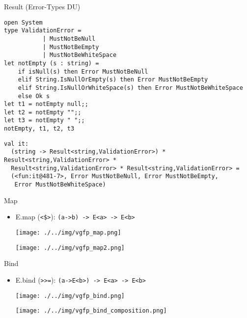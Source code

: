 \documentclass[t]{beamer}
\begin{document}
\begin{frame}[label={sec:org088bd28},fragile]{Result (Error-Types DU)}
 \begin{verbatim}
open System
type ValidationError =
           | MustNotBeNull
           | MustNotBeEmpty
           | MustNotBeWhiteSpace
let notEmpty (s : string) =
    if isNull(s) then Error MustNotBeNull
    elif String.IsNullOrEmpty(s) then Error MustNotBeEmpty
    elif String.IsNullOrWhiteSpace(s) then Error MustNotBeWhiteSpace
    else Ok s
let t1 = notEmpty null;;
let t2 = notEmpty "";;
let t3 = notEmpty " ";;
notEmpty, t1, t2, t3
\end{verbatim}

\begin{verbatim}
val it:
  (string -> Result<string,ValidationError>) * Result<string,ValidationError> *
  Result<string,ValidationError> * Result<string,ValidationError> =
  (<fun:it@481-7>, Error MustNotBeNull, Error MustNotBeEmpty,
   Error MustNotBeWhiteSpace)
\end{verbatim}
\end{frame}

\begin{frame}[label={sec:org7eb9096},fragile]{Map}
 \begin{itemize}
\item E.map (\texttt{<\$>}): \texttt{(a->b) -> E<a> -> E<b>}
\begin{center}
\texttt{[image: ./../img/vgfp\_map.png]}
\end{center}
\begin{center}
\texttt{[image: ./../img/vgfp\_map2.png]}
\end{center}
\end{itemize}
\end{frame}

\begin{frame}[label={sec:orgf101aea},fragile]{Bind}
 \begin{itemize}
\item E.bind (\texttt{>>=}): \texttt{(a->E<b>) -> E<a> -> E<b>}
\begin{center}
\texttt{[image: ./../img/vgfp\_bind.png]}
\end{center}
\begin{center}
\texttt{[image: ./../img/vgfp\_bind\_composition.png]}
\end{center}
\end{itemize}
\end{frame}
\end{document}
